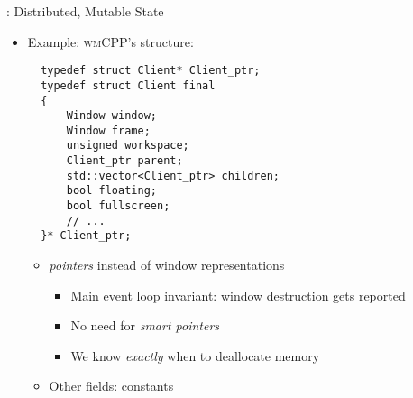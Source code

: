 \begin{frame}[fragile]{\underline{\cpp}: Distributed, Mutable State \hfill {\footnotesize \currentname}}

    \begin{itemize}

        \item Example: \textsc{wmCPP}'s  structure:\\[3pt]
\begin{verbatim}
  typedef struct Client* Client_ptr;
  typedef struct Client final
  {
      Window window;
      Window frame;
      unsigned workspace;
      Client_ptr parent;
      std::vector<Client_ptr> children;
      bool floating;
      bool fullscreen;
      // ...
  }* Client_ptr;
\end{verbatim}

    \vspace*{5pt}\begin{itemize}

        \item {} \textit{pointers} instead of window representations
            \begin{itemize}
                \item Main event loop invariant: window destruction gets reported
                \item No need for \textit{smart pointers}
                \item We know \textit{exactly} when to deallocate memory
            \end{itemize}

        \item Other fields:  constants

    \end{itemize}

    \end{itemize}

    \vfill

\end{frame}

